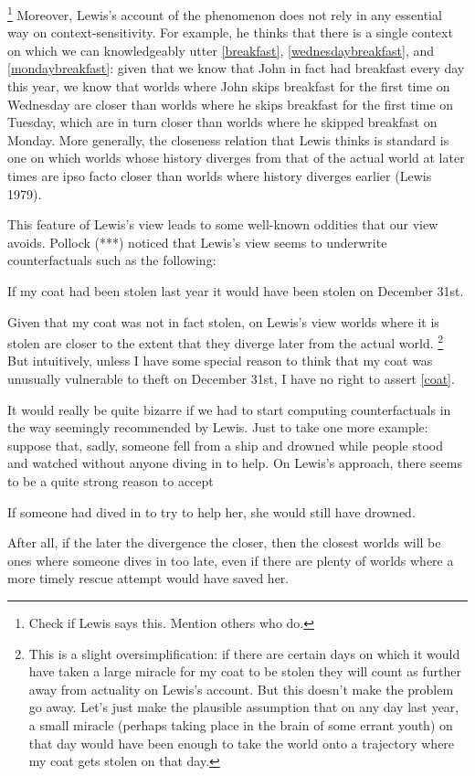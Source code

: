 \documentclass[If.tex]{subfiles}
\begin{document}
\begin{prop}
\footnote{Check if Lewis says this. Mention others who do.}
 Moreover, Lewis's account of the phenomenon does not rely in any essential way on context-sensitivity. For example, he thinks that there is a single context on which we can knowledgeably utter \ref{breakfast}, \ref{wednesdaybreakfast}, and \ref{mondaybreakfast}: given that we know that John in fact had breakfast every day this year, we know that worlds where John skips breakfast for the first time on Wednesday are closer than worlds where he skips breakfast for the first time on Tuesday, which are in turn closer than worlds where he skipped breakfast on Monday. More generally, the closeness relation that Lewis thinks is standard is one on which worlds whose history diverges from that of the actual world at later times are ipso facto closer than worlds where history diverges earlier (Lewis 1979).

This feature of Lewis's view leads to some well-known oddities that our view avoids. Pollock (***) noticed that Lewis's view seems to underwrite counterfactuals such as the following:
\begin{prop}
	\nitem \label{coat}
		If my coat had been stolen last year it would have been stolen on December 31st.
\end{prop}
Given that my coat was not in fact stolen, on Lewis's view worlds where it is stolen are closer to the extent that they diverge later from the actual world.%
\footnote{This is a slight oversimplification: if there are certain days on which it would have taken a large miracle for my coat to be stolen they will count as further away from actuality on Lewis's account. But this doesn't make the problem go away. Let's just make the plausible assumption that on any day last year, a small miracle (perhaps taking place in the brain of some errant youth) on that day would have been enough to take the world onto a trajectory where my coat gets stolen on that day.}
 But intuitively, unless I have some special reason to think that my coat was unusually vulnerable to theft on December 31st, I have no right to assert \ref{coat}.

It would really be quite bizarre if we had to start computing counterfactuals in the way seemingly recommended by Lewis. Just to take one more example: suppose that, sadly, someone fell from a ship and drowned while people stood and watched without anyone diving in to help. On Lewis's approach, there seems to be a quite strong reason to accept
\begin{prop}
	\nitem \label{drowning}
		If someone had dived in to try to help her, she would still have drowned.
\end{prop}
After all, if the later the divergence the closer, then the closest worlds will be ones where someone dives in too late, even if there are plenty of worlds where a more timely rescue attempt would have saved her.


\end{prop}
\end{document}
